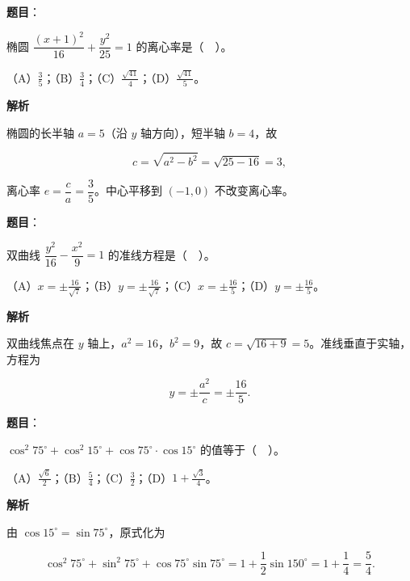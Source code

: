 \begin{answer}

\textbf{题目}：

椭圆 $\dfrac{(x+1)^2}{16}+\dfrac{y^2}{25}=1$ 的离心率是（　）。

（A）$\frac35$；（B）$\frac34$；（C）$\frac{\sqrt{41}}{4}$；（D）$\frac{\sqrt{41}}{5}$。

\textbf{解析}

椭圆的长半轴 $a=5$（沿 $y$ 轴方向），短半轴 $b=4$，故

\nopagebreak[4]
\[
c=\sqrt{a^2-b^2}=\sqrt{25-16}=3,
\]

离心率 $e=\dfrac{c}{a}=\dfrac35$。中心平移到 $(-1,0)$ 不改变离心率。


\end{answer}
\begin{answer}

\textbf{题目}：

双曲线 $\dfrac{y^2}{16}-\dfrac{x^2}{9}=1$ 的准线方程是（　）。

（A）$x=\pm\frac{16}{\sqrt7}$；（B）$y=\pm\frac{16}{\sqrt7}$；（C）$x=\pm\frac{16}{5}$；（D）$y=\pm\frac{16}{5}$。

\textbf{解析}

双曲线焦点在 $y$ 轴上，$a^2=16$，$b^2=9$，故 $c=\sqrt{16+9}=5$。准线垂直于实轴，方程为

\nopagebreak[4]
\[
y=\pm\frac{a^2}{c}=\pm\frac{16}{5}.
\]


\end{answer}
\begin{answer}

\textbf{题目}：

$\cos^2 75^\circ+\cos^2 15^\circ+\cos 75^\circ\cdot\cos 15^\circ$ 的值等于（　）。

（A）$\frac{\sqrt6}{2}$；（B）$\frac54$；（C）$\frac32$；（D）$1+\frac{\sqrt3}{4}$。

\textbf{解析}

由 $\cos 15^\circ=\sin 75^\circ$，原式化为

\nopagebreak[4]
\[
\cos^2 75^\circ+\sin^2 75^\circ+\cos 75^\circ\sin 75^\circ
=1+\frac12\sin 150^\circ
=1+\frac14=\frac54.
\]


\end{answer}

